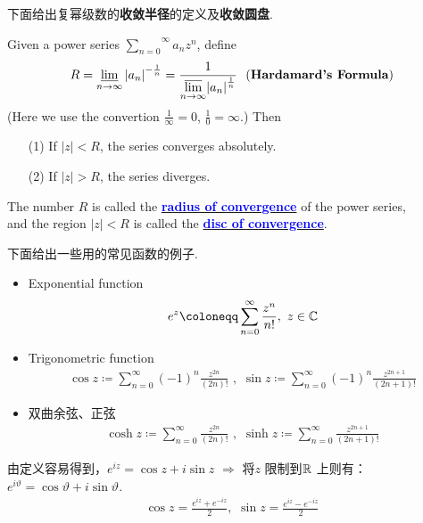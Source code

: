 \vspace{2em}
下面给出复幂级数的\textbf{收敛半径}的定义及\textbf{收敛圆盘}.
\begin{thm}\label{thm 3.1.1}
	Given a power series $\overset{\infty}{\underset{n = 0}{\sum}}{a_n z^n}$, define
	\begin{align}
		R = \varliminf_{n \to \infty}{\left| a_n \right|^{-\frac{1}{n}}} = \frac{1}{\underset{n \to \infty}{\varlimsup}{\left| a_n \right|^{\frac{1}{n}}}} 
		\,\,\,\, (\textbf{Hardamard's Formula})
	\end{align}
	(Here we use the convertion $\frac{1}{\infty} = 0$, $\frac{1}{0} = \infty$.) Then
	\begin{enumerate}
		\item[(1)]If $\left| z \right| < R$, the series converges absolutely.
		
		\item[(2)]If $\left| z \right| > R$, the series diverges.
	\end{enumerate}
	
	\begin{rmk}
		The number $R$ is called the \underline{\textcolor{blue}{\textbf{radius of convergence}}} of the power series, \\
		and the region $\left| z \right| < R$ is called the \underline{\textcolor{blue}{\textbf{disc of convergence}}}.
	\end{rmk}
\end{thm}

\newpage
\begin{example}\label{ex 3.1.1}
	下面给出一些用的常见函数的例子.
	\begin{itemize}
		\item Exponential function
		\begin{align}
			e^z \coloneqq \sum_{n = 0}^{\infty}{\frac{z^n}{n!}} , \,\, z \in \C
		\end{align}
		
		\item Trigonometric function
		\begin{align}
			\cos{z} \coloneqq \sum_{n = 0}^{\infty}{(-1)^{n} \frac{z^{2n}}{(2n)!}} \,\, , \,\, \sin{z} \coloneqq \sum_{n = 0}^{\infty}{(-1)^{n} \frac{z^{2n + 1}}{(2n + 1)!}}
		\end{align}
		
		\item 双曲余弦、正弦
		\begin{align}
			\cosh{z} \coloneqq \sum_{n = 0}^{\infty}{\frac{z^{2n}}{(2n)!}} \,\, , \,\, \sinh{z} \coloneqq \sum_{n = 0}^{\infty}{\frac{z^{2n + 1}}{(2n + 1)!}}
		\end{align}
	\end{itemize}
	
	\begin{rmk}
		由定义容易得到，$e^{iz} = \cos{z} + i\sin{z}$ $\Rightarrow$ 将$z$ 限制到$\mathbb{R}$ 上则有：$e^{i\vartheta} = \cos{\vartheta} + i\sin{\vartheta}$.
		\begin{align}
			\cos{z} = \frac{e^{iz} + e^{-iz}}{2} , \,\, \sin{z} = \frac{e^{iz} - e^{-iz}}{2}
		\end{align}
	\end{rmk}
\end{example}

